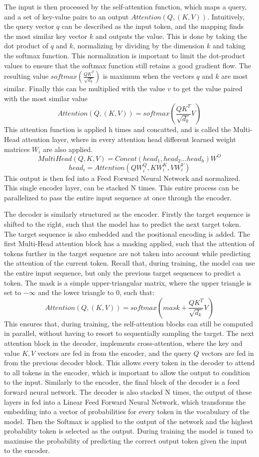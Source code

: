 The input is then processed by the self-attention function, which maps a query, and a set of key-value pairs to an output \(Attention(Q,(K,V))\). Intuitively, the query vector \(q\) can be described as the input token, and the mapping finds the most similar key vector \(k\) and outputs the value. This is done by taking the dot product of \(q\) and \(k\), normalizing by dividing by the dimension \(k\) and taking the softmax function. This normalization is important to limit the dot-product values to ensure that the softmax function still retains a good gradient flow. The resulting value \(softmax(\frac{QK^T}{\sqrt{d_k}})\) is maximum when the vectors \(q\) and \(k\) are most similar. Finally this can be multiplied with the value \(v\) to get the value paired with the most similar value \[Attention(Q,(K,V)) = softmax(\frac{QK^T}{\sqrt{d_k}}V)\]
This attention function is applied h times and concatted, and is called the Multi-Head attention layer, where in every attention head different learned weight matrices \(W_i\) are also applied. 
\[MultiHead(Q,K,V) = Concat(head_1, head_2 ... head_h) W^O\]
\[ head_i = Attention(QW^Q_i,KW^K_i,VW^V_i)\] This output is then fed into a Feed Forward Neural Network and normalized. This single encoder layer, can be stacked N times. This entire process can be parallelized to pass the entire input sequence at once through the encoder. 

The decoder is similarly structured as the encoder. Firstly the target sequence is shifted to the right, such that the model has to predict the next target token. The target sequence is also embedded and the positional encoding is added. The first Multi-Head attention block has a masking applied, such that the attention of tokens further in the target sequence are not taken into account while predicting the attention of the current token. Recall that, during training, the model can use the entire input sequence, but only the previous target sequences to predict a token. The mask is a simple upper-triangular matrix, where the upper triangle is set to \(-\infty\) and the lower triangle to \(0\), such that: \[Attention(Q,(K,V)) = softmax(mask + \frac{QK^T}{\sqrt{d_k}}V)\]
This ensures that, during training, the self-attention blocks can still be computed in parallel, without having to resort to sequentially sampling the target.
The next attention block in the decoder, implements cross-attention, where the key and value \(K, V\) vectors are fed in from the encoder, and the query \(Q\) vectors are fed in from the previous decoder block. This allows every token in the decoder to attend to all tokens in the encoder, which is important to allow the output to condition to the input. Similarly to the encoder, the final block of the decoder is a feed forward neural network. The decoder is also stacked N times, the output of these layers in fed into a Linear Feed Forward Neural Network, which transforms the embedding into a vector of probabilities for every token in the vocabulary of the model. Then the Softmax is applied to the output of the network and the highest probability token is selected as the output. During training the model is tuned to maximise the probability of predicting the correct output token given the input to the encoder.


